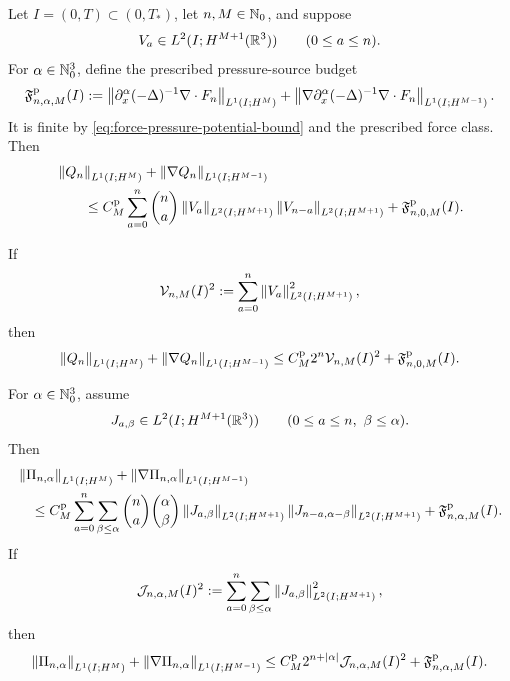 \begin{theorem}
\label{thm:formal-finite-row-pressure}
Let \(I=(0,T)\subset(0,T_*)\), let \(n,M\in\mathbb N_0\), and suppose
\[
 V_a\in L^2(I;H^{M+1}(\mathbb R^3))
 \qquad(0\le a\le n).
\]
For \(\alpha\in\mathbb N_0^3\), define the prescribed pressure-source budget
\begin{equation}
 \mathfrak F^{\rm p}_{n,\alpha,M}(I)
 :=\left\lVert \partial_x^\alpha(-\Delta)^{-1}\nabla\cdot F_n\right\rVert_{L^1(I;H^M)}
 +\left\lVert \nabla\partial_x^\alpha(-\Delta)^{-1}\nabla\cdot F_n\right\rVert_{L^1(I;H^{M-1})}.
 \label{eq:force-pressure-budget}
\end{equation}
It is finite by \eqref{eq:force-pressure-potential-bound} and the prescribed
force class.
Then
\begin{align}
 &\left\lVert Q_n\right\rVert_{L^1(I;H^M)}
 +\left\lVert \nabla Q_n\right\rVert_{L^1(I;H^{M-1})}
 \notag\\
 &\qquad\le
 C_M^{\rm p}\sum_{a=0}^{n}\binom na
 \left\lVert V_a\right\rVert_{L^2(I;H^{M+1})}
 \left\lVert V_{n-a}\right\rVert_{L^2(I;H^{M+1})}
 +\mathfrak F^{\rm p}_{n,0,M}(I).
 \label{eq:formal-finite-pressure-L1}
\end{align}
\begin{samepage}
If
\[
 \mathcal V_{n,M}(I)^2
 :=\sum_{a=0}^{n}
 \left\lVert V_a\right\rVert_{L^2(I;H^{M+1})}^2,
\]
then
\begin{equation}
 \left\lVert Q_n\right\rVert_{L^1(I;H^M)}
 +\left\lVert \nabla Q_n\right\rVert_{L^1(I;H^{M-1})}
 \le C_M^{\rm p}2^n\mathcal V_{n,M}(I)^2
 +\mathfrak F^{\rm p}_{n,0,M}(I).
 \label{eq:formal-finite-pressure-compressed}
\end{equation}
\end{samepage}
For \(\alpha\in\mathbb N_0^3\), assume
\[
 J_{a,\beta}\in L^2(I;H^{M+1}(\mathbb R^3))
 \qquad
 (0\le a\le n,\ \beta\le\alpha).
\]
Then
\begin{align}
 &\left\lVert \Pi_{n,\alpha}\right\rVert_{L^1(I;H^M)}
 +\left\lVert \nabla\Pi_{n,\alpha}\right\rVert_{L^1(I;H^{M-1})}
 \notag\\
 &\quad\le
 C_M^{\rm p}
 \sum_{a=0}^{n}\sum_{\beta\le\alpha}
 \binom na\binom{\alpha}{\beta}
 \left\lVert J_{a,\beta}\right\rVert_{L^2(I;H^{M+1})}
 \left\lVert J_{n-a,\alpha-\beta}\right\rVert_{L^2(I;H^{M+1})}
 +\mathfrak F^{\rm p}_{n,\alpha,M}(I).
 \label{eq:formal-finite-mixed-pressure-L1}
\end{align}
If
\[
 \mathcal J_{n,\alpha,M}(I)^2
 :=
 \sum_{a=0}^{n}\sum_{\beta\le\alpha}
 \left\lVert J_{a,\beta}\right\rVert_{L^2(I;H^{M+1})}^2,
\]
then
\begin{equation}
 \left\lVert \Pi_{n,\alpha}\right\rVert_{L^1(I;H^M)}
 +\left\lVert \nabla\Pi_{n,\alpha}\right\rVert_{L^1(I;H^{M-1})}
 \le
 C_M^{\rm p}2^{n+|\alpha|}
 \mathcal J_{n,\alpha,M}(I)^2
 +\mathfrak F^{\rm p}_{n,\alpha,M}(I).
 \label{eq:formal-finite-mixed-pressure-compressed}
\end{equation}
\end{theorem}

